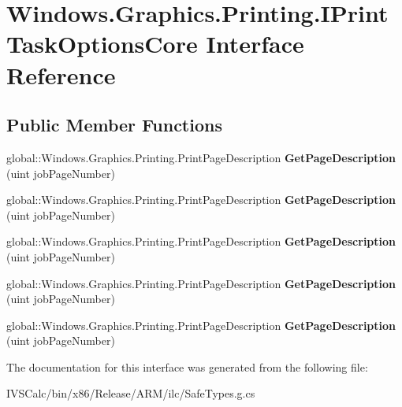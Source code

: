 \hypertarget{interface_windows_1_1_graphics_1_1_printing_1_1_i_print_task_options_core}{}\section{Windows.\+Graphics.\+Printing.\+I\+Print\+Task\+Options\+Core Interface Reference}
\label{interface_windows_1_1_graphics_1_1_printing_1_1_i_print_task_options_core}
\subsection*{Public Member Functions}
\begin{DoxyCompactItemize}
\item 
\mbox{\label{interface_windows_1_1_graphics_1_1_printing_1_1_i_print_task_options_core_acb595d2b9446e7945f7ced04c652a480}} 
global\+::\+Windows.\+Graphics.\+Printing.\+Print\+Page\+Description {\bfseries Get\+Page\+Description} (uint job\+Page\+Number)
\item 
\mbox{\label{interface_windows_1_1_graphics_1_1_printing_1_1_i_print_task_options_core_acb595d2b9446e7945f7ced04c652a480}} 
global\+::\+Windows.\+Graphics.\+Printing.\+Print\+Page\+Description {\bfseries Get\+Page\+Description} (uint job\+Page\+Number)
\item 
\mbox{\label{interface_windows_1_1_graphics_1_1_printing_1_1_i_print_task_options_core_acb595d2b9446e7945f7ced04c652a480}} 
global\+::\+Windows.\+Graphics.\+Printing.\+Print\+Page\+Description {\bfseries Get\+Page\+Description} (uint job\+Page\+Number)
\item 
\mbox{\label{interface_windows_1_1_graphics_1_1_printing_1_1_i_print_task_options_core_acb595d2b9446e7945f7ced04c652a480}} 
global\+::\+Windows.\+Graphics.\+Printing.\+Print\+Page\+Description {\bfseries Get\+Page\+Description} (uint job\+Page\+Number)
\item 
\mbox{\label{interface_windows_1_1_graphics_1_1_printing_1_1_i_print_task_options_core_acb595d2b9446e7945f7ced04c652a480}} 
global\+::\+Windows.\+Graphics.\+Printing.\+Print\+Page\+Description {\bfseries Get\+Page\+Description} (uint job\+Page\+Number)
\end{DoxyCompactItemize}


The documentation for this interface was generated from the following file\+:\begin{DoxyCompactItemize}
\item 
I\+V\+S\+Calc/bin/x86/\+Release/\+A\+R\+M/ilc/Safe\+Types.\+g.\+cs\end{DoxyCompactItemize}
